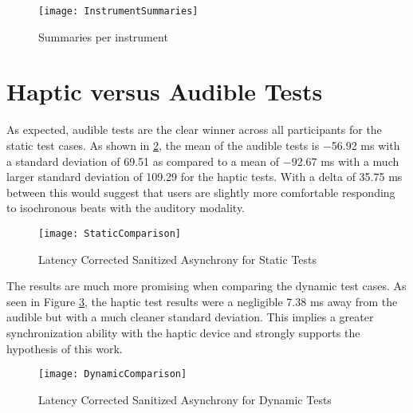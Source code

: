 \begin{figure}[H]
    \centering
    \texttt{[image: InstrumentSummaries]}
    \caption{Summaries per instrument}
    \label{fig:InstrumentSummaries}
\end{figure}

\section{Haptic versus Audible Tests}
As expected, audible tests are the clear winner across all participants for the static test cases. As shown in \ref{fig:StaticComparison}, the mean of the audible tests is $-$56.92 ms with a standard deviation of 69.51 as compared to a mean of $-$92.67 ms with a much larger standard deviation of 109.29 for the haptic tests. With a delta of 35.75 ms between this would suggest that users are slightly more comfortable responding to isochronous beats with the auditory modality.
\begin{figure}[H]
    \centering
    \texttt{[image: StaticComparison]}
    \caption{Latency Corrected Sanitized Asynchrony for Static Tests}
    \label{fig:StaticComparison}
\end{figure}

The results are much more promising when comparing the dynamic test cases. As seen in Figure \ref{fig:DynamicComparison}, the haptic test results were a negligible 7.38 ms away from the audible but with a much cleaner standard deviation. This implies a greater synchronization ability with the haptic device and strongly supports the hypothesis of this work.

\begin{figure}[H]
    \centering
    \texttt{[image: DynamicComparison]}
    \caption{Latency Corrected Sanitized Asynchrony for Dynamic Tests}
    \label{fig:DynamicComparison}
\end{figure}

